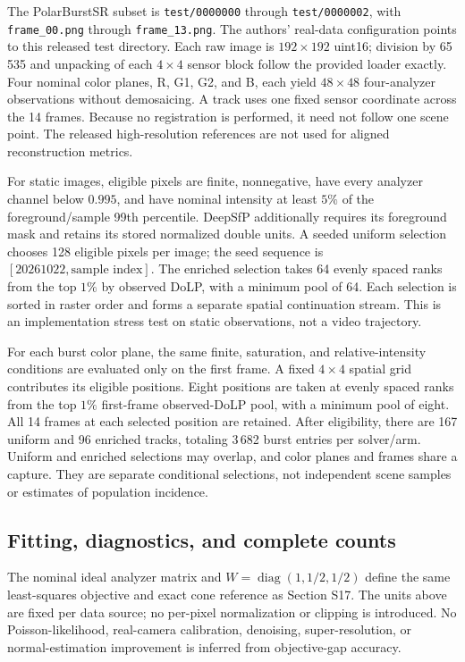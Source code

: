 The PolarBurstSR subset is \nolinkurl{test/0000000} through \nolinkurl{test/0000002}, with \nolinkurl{frame_00.png} through \nolinkurl{frame_13.png}. The authors' real-data configuration points to this released test directory. Each raw image is $192\times192$ uint16; division by 65\,535 and unpacking of each $4\times4$ sensor block follow the provided loader exactly. Four nominal color planes, R, G1, G2, and B, each yield $48\times48$ four-analyzer observations without demosaicing. A track uses one fixed sensor coordinate across the 14 frames. Because no registration is performed, it need not follow one scene point. The released high-resolution references are not used for aligned reconstruction metrics.

For static images, eligible pixels are finite, nonnegative, have every analyzer channel below $0.995$, and have nominal intensity at least $5\%$ of the foreground/sample 99th percentile. DeepSfP additionally requires its foreground mask and retains its stored normalized double units. A seeded uniform selection chooses 128 eligible pixels per image; the seed sequence is $[20261022,\text{sample index}]$. The enriched selection takes 64 evenly spaced ranks from the top $1\%$ by observed DoLP, with a minimum pool of 64. Each selection is sorted in raster order and forms a separate spatial continuation stream. This is an implementation stress test on static observations, not a video trajectory.

For each burst color plane, the same finite, saturation, and relative-intensity conditions are evaluated only on the first frame. A fixed $4\times4$ spatial grid contributes its eligible positions. Eight positions are taken at evenly spaced ranks from the top $1\%$ first-frame observed-DoLP pool, with a minimum pool of eight. All 14 frames at each selected position are retained. After eligibility, there are 167 uniform and 96 enriched tracks, totaling 3\,682 burst entries per solver/arm. Uniform and enriched selections may overlap, and color planes and frames share a capture. They are separate conditional selections, not independent scene samples or estimates of population incidence.

\subsection{Fitting, diagnostics, and complete counts}
The nominal ideal analyzer matrix and $W=\operatorname{diag}(1,1/2,1/2)$ define the same least-squares objective and exact cone reference as Section S17. The units above are fixed per data source; no per-pixel normalization or clipping is introduced. No Poisson-likelihood, real-camera calibration, denoising, super-resolution, or normal-estimation improvement is inferred from objective-gap accuracy.

